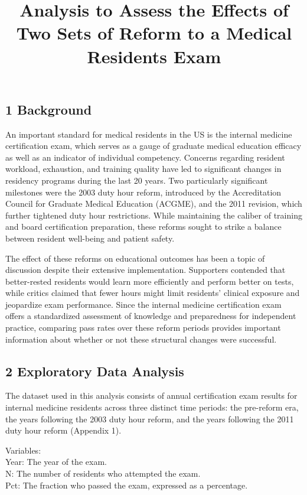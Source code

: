 \documentclass[
]{article}
\title{Analysis to Assess the Effects of Two Sets of Reform to a Medical
Residents Exam}
\author{}
\date{\vspace{-2.5em}}
\begin{document}
\maketitle

\subsection{1 Background}\label{background}

An important standard for medical residents in the US is the internal
medicine certification exam, which serves as a gauge of graduate medical
education efficacy as well as an indicator of individual competency.
Concerns regarding resident workload, exhaustion, and training quality
have led to significant changes in residency programs during the last 20
years. Two particularly significant milestones were the 2003 duty hour
reform, introduced by the Accreditation Council for Graduate Medical
Education (ACGME), and the 2011 revision, which further tightened duty
hour restrictions. While maintaining the caliber of training and board
certification preparation, these reforms sought to strike a balance
between resident well-being and patient safety.

The effect of these reforms on educational outcomes has been a topic of
discussion despite their extensive implementation. Supporters contended
that better-rested residents would learn more efficiently and perform
better on tests, while critics claimed that fewer hours might limit
residents' clinical exposure and jeopardize exam performance. Since the
internal medicine certification exam offers a standardized assessment of
knowledge and preparedness for independent practice, comparing pass
rates over these reform periods provides important information about
whether or not these structural changes were successful.

\subsection{2 Exploratory Data
Analysis}\label{exploratory-data-analysis}

The dataset used in this analysis consists of annual certification exam
results for internal medicine residents across three distinct time
periods: the pre-reform era, the years following the 2003 duty hour
reform, and the years following the 2011 duty hour reform (Appendix 1).

Variables:\\
Year: The year of the exam.\\
N: The number of residents who attempted the exam.\\
Pct: The fraction who passed the exam, expressed as a percentage.
\end{document}
